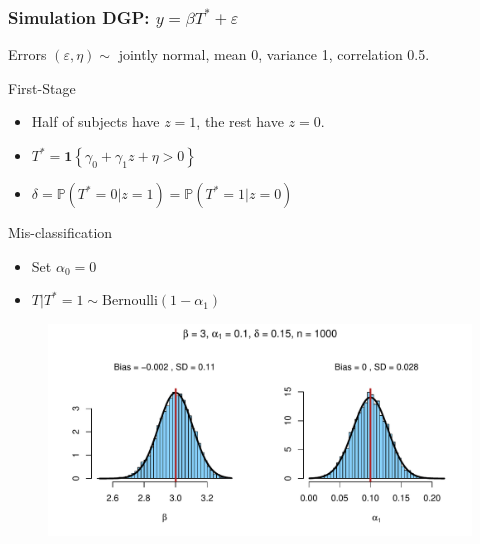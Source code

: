 \documentclass{beamer}
\begin{document}
\begin{frame}
  \frametitle{Simulation DGP: $y = \beta T^* + \varepsilon$}
  \begin{block}{Errors}
      $(\varepsilon, \eta) \sim $ jointly normal, mean 0, variance 1, correlation 0.5.
  \end{block}
  \begin{block}{First-Stage}
      \begin{itemize}
        \item Half of subjects have $z=1$, the rest have $z=0$.
        \item $T^* = \mathbf{1}\left\{ \gamma_0 + \gamma_1 z + \eta > 0 \right\}$
        \item $\delta = \mathbb{P}(T^* = 0|z =1) = \mathbb{P}(T^*=1|z=0)$
      \end{itemize}
  \end{block}
  \vspace{-1em}


  \begin{block}{Mis-classification}
      \begin{itemize}
        \item Set $\alpha_0 = 0$ 
        \item $T|T^*=1 \sim \mbox{Bernoulli}(1-\alpha_1)$
      \end{itemize}
  \end{block}
  
\end{frame}
\begin{frame}[plain,c]

  \begin{figure}[h]
    \centering
    \includegraphics[width=\textwidth]{Rplot1}
  \end{figure}

\end{frame}
\end{document}
